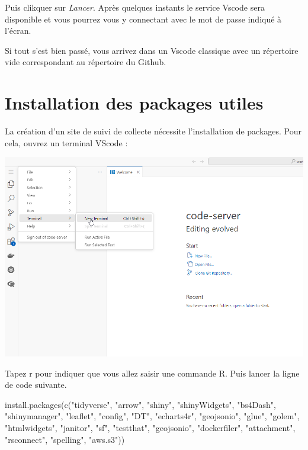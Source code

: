 \documentclass[
  letterpaper,
  DIV=11,
  numbers=noendperiod]{scrreprt}
\newenvironment{Shaded}{\begin{snugshade}}{\end{snugshade}}
\newcommand{\FunctionTok}[1]{\textcolor[rgb]{0.28,0.35,0.67}{#1}}
\newcommand{\NormalTok}[1]{\textcolor[rgb]{0.00,0.23,0.31}{#1}}
\newcommand{\StringTok}[1]{\textcolor[rgb]{0.13,0.47,0.30}{#1}}
\begin{document}
Puis clikquer sur \emph{Lancer}. Après quelques instants le service
Vscode sera disponible et vous pourrez vous y connectant avec le mot de
passe indiqué à l'écran.

Si tout s'est bien passé, vous arrivez dans un Vscode classique avec un
répertoire vide correspondant au répertoire du Github.

\hypertarget{installation-des-packages-utiles}{%
\section{Installation des packages
utiles}\label{installation-des-packages-utiles}}

La création d'un site de suivi de collecte nécessite l'installation de
packages. Pour cela, ouvrez un terminal VScode :

\includegraphics{./images/VSCode_new_terminal.png}

Tapez r pour indiquer que vous allez saisir une commande R. Puis lancer
la ligne de code suivante.

\begin{Shaded}
\begin{Highlighting}[]
\FunctionTok{install.packages}\NormalTok{(}\FunctionTok{c}\NormalTok{(}\StringTok{"tidyverse"}\NormalTok{, }\StringTok{"arrow"}\NormalTok{, }\StringTok{"shiny"}\NormalTok{, }\StringTok{"shinyWidgets"}\NormalTok{, }\StringTok{"bs4Dash"}\NormalTok{, }\StringTok{"shinymanager"}\NormalTok{, }\StringTok{"leaflet"}\NormalTok{, }\StringTok{"config"}\NormalTok{, }\StringTok{"DT"}\NormalTok{, }\StringTok{"echarts4r"}\NormalTok{, }\StringTok{"geojsonio"}\NormalTok{, }\StringTok{"glue"}\NormalTok{, }\StringTok{"golem"}\NormalTok{, }\StringTok{"htmlwidgets"}\NormalTok{, }\StringTok{"janitor"}\NormalTok{, }\StringTok{"sf"}\NormalTok{, }\StringTok{"testthat"}\NormalTok{, }\StringTok{"geojsonio"}\NormalTok{, }\StringTok{"dockerfiler"}\NormalTok{, }\StringTok{"attachment"}\NormalTok{, }\StringTok{"rsconnect"}\NormalTok{, }\StringTok{"spelling"}\NormalTok{, }\StringTok{"aws.s3"}\NormalTok{))}
\end{Highlighting}
\end{Shaded}
\end{document}
